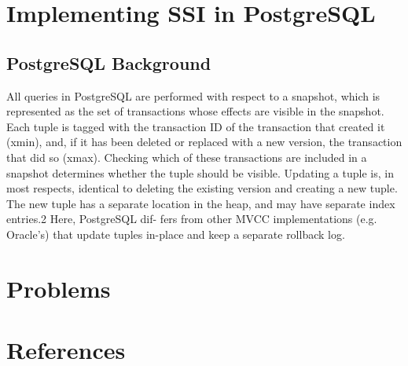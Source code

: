 \documentclass[11pt]{article}
\begin{document}
\section{Implementing SSI in PostgreSQL}
\label{sec:org08612a1}
\subsection{PostgreSQL Background}
\label{sec:orgfda58f0}
        All queries in PostgreSQL are performed with respect to a snapshot, which is represented as the set of transactions whose effects
are visible in the snapshot. Each tuple is tagged with the transaction
ID of the transaction that created it (xmin), and, if it has been deleted
or replaced with a new version, the transaction that did so (xmax).
Checking which of these transactions are included in a snapshot
determines whether the tuple should be visible. Updating a tuple
is, in most respects, identical to deleting the existing version and
creating a new tuple. The new tuple has a separate location in the
heap, and may have separate index entries.2 Here, PostgreSQL dif-
fers from other MVCC implementations (e.g. Oracle’s) that update
tuples in-place and keep a separate rollback log.
\section{Problems}
\label{sec:org4d16092}


\section{References}
\label{sec:org9f9842a}
\label{bibliographystyle link}


\label{bibliography link}

\end{document}
